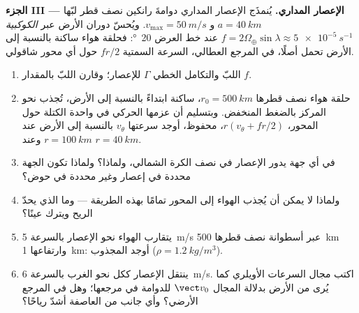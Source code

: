 \begin{problem}
\medskip
\noindent\textbf{الجزء III --- الإعصار المداري.}
يُنمذَج الإعصار المداري دوامةَ رانكين نصف قطر لبّها
$a = \qty{40}{km}$ و $v_{\max} = \qty{50}{m/s}$. ويُحسّ دوران الأرض
عبر \emph{ الكوكبية} $f = 2\Omega_\oplus\sin\lambda
\approx \qty{5e-5}{s^{-1}}$ عند خط العرض \qty{20}{\degree}: فحلقة هواء
ساكنة بالنسبة إلى الأرض تحمل أصلًا، في المرجع العطالي،
السرعة السمتية $fr/2$ حول أي محور شاقولي.
\begin{enumerate}[resume]
  \item {} اللبّ والتكامل الخطي $\Gamma$ للإعصار؛
        وقارن  اللبّ بالمقدار $f$.
  \item حلقة هواء نصف قطرها $r_0 = \qty{500}{km}$، ساكنة ابتداءً
        بالنسبة إلى الأرض، تُجذب نحو المركز بالضغط المنخفض.
        وبتسليم أن عزمها الحركي في واحدة الكتلة حول المحور،
        $r(v_\theta + fr/2)$، محفوظ، أوجد سرعتها $v_\theta$
        بالنسبة إلى الأرض عند $r = \qty{100}{km}$
        وعند $r = \qty{40}{km}$.
  \item في أي جهة يدور الإعصار في نصف الكرة الشمالي، ولماذا؟
        ولماذا تكون الجهة محددة في إعصار وغير محددة في حوض؟
  \item ولماذا لا يمكن أن يُجذب الهواء إلى المحور تمامًا بهذه
        الطريقة --- وما الذي يحدّ الريح ويترك عينًا؟
  \item يتقارب الهواء نحو الإعصار بالسرعة \qty{5}{m/s} عبر
        أسطوانة نصف قطرها \qty{500}{km} وارتفاعها \qty{1}{km}: أوجد
         المجذوب ($\rho = \qty{1.2}{kg/m^3}$).
  \item ينتقل الإعصار ككل نحو الغرب بالسرعة \qty{6}{m/s}. اكتب
        مجال السرعات الأويلري كما يُرى من الأرض بدلالة المجال
        $\vect v_0$ للدوامة في مرجعها؛ وهل  في
        المرجع الأرضي؟ وأي جانب من العاصفة أشدّ رياحًا؟
\end{enumerate}


\end{problem}
